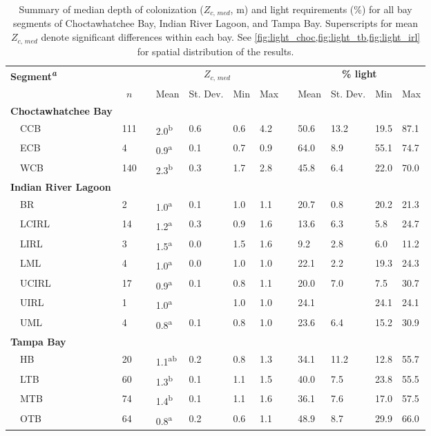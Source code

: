 \documentclass[letterpaper,12pt,oneside]{article}\usepackage[]{graphicx}\usepackage[]{color}
\begin{document}
\begin{table}[!tbp]
{\small
\caption{Summary of median depth of colonization ($Z_{c,\,med}$, m) and light requirements (\%) for all bay segments of Choctawhatchee Bay, Indian River Lagoon, and Tampa Bay.  Superscripts for mean $Z_{c,\,med}$ denote significant differences within each bay. See \cref{fig:light_choc,fig:light_tb,fig:light_irl} for spatial distribution of the results.\label{tab:light_summ}} 
\begin{center}
\begin{tabular}{llcllllcllll}
\hline\hline
\multicolumn{1}{l}{\bfseries Segment\textsuperscript{\textit{a}}}&\multicolumn{1}{c}{\bfseries }&\multicolumn{1}{c}{\bfseries }&\multicolumn{4}{c}{\bfseries {\bf $Z_{c,\,med}$}}&\multicolumn{1}{c}{\bfseries }&\multicolumn{4}{c}{\bfseries \% light}\tabularnewline
\cline{4-7} \cline{9-12}
\multicolumn{1}{l}{}&\multicolumn{1}{c}{$n$}&\multicolumn{1}{c}{}&\multicolumn{1}{c}{Mean}&\multicolumn{1}{c}{St. Dev.}&\multicolumn{1}{c}{Min}&\multicolumn{1}{c}{Max}&\multicolumn{1}{c}{}&\multicolumn{1}{c}{Mean}&\multicolumn{1}{c}{St. Dev.}&\multicolumn{1}{c}{Min}&\multicolumn{1}{c}{Max}\tabularnewline
\hline
{\bfseries Choctawhatchee Bay}&&&&&&&&&&&\tabularnewline
~~CCB&111&&2.0\textsuperscript{b}&0.6&0.6&4.2&&50.6&13.2&19.5&87.1\tabularnewline
~~ECB&4&&0.9\textsuperscript{a}&0.1&0.7&0.9&&64.0& 8.9&55.1&74.7\tabularnewline
~~WCB&140&&2.3\textsuperscript{b}&0.3&1.7&2.8&&45.8& 6.4&22.0&70.0\tabularnewline
\hline
{\bfseries Indian River Lagoon}&&&&&&&&&&&\tabularnewline
~~BR&2&&1.0\textsuperscript{a}&0.1&1.0&1.1&&20.7& 0.8&20.2&21.3\tabularnewline
~~LCIRL&14&&1.2\textsuperscript{a}&0.3&0.9&1.6&&13.6& 6.3& 5.8&24.7\tabularnewline
~~LIRL&3&&1.5\textsuperscript{a}&0.0&1.5&1.6&& 9.2& 2.8& 6.0&11.2\tabularnewline
~~LML&4&&1.0\textsuperscript{a}&0.0&1.0&1.0&&22.1& 2.2&19.3&24.3\tabularnewline
~~UCIRL&17&&0.9\textsuperscript{a}&0.1&0.8&1.1&&20.0& 7.0& 7.5&30.7\tabularnewline
~~UIRL&1&&1.0\textsuperscript{a}& &1.0&1.0&&24.1& &24.1&24.1\tabularnewline
~~UML&4&&0.8\textsuperscript{a}&0.1&0.8&1.0&&23.6& 6.4&15.2&30.9\tabularnewline
\hline
{\bfseries Tampa Bay}&&&&&&&&&&&\tabularnewline
~~HB&20&&1.1\textsuperscript{ab}&0.2&0.8&1.3&&34.1&11.2&12.8&55.7\tabularnewline
~~LTB&60&&1.3\textsuperscript{b}&0.1&1.1&1.5&&40.0& 7.5&23.8&55.5\tabularnewline
~~MTB&74&&1.4\textsuperscript{b}&0.1&1.1&1.6&&36.1& 7.6&17.0&57.5\tabularnewline
~~OTB&64&&0.8\textsuperscript{a}&0.2&0.6&1.1&&48.9& 8.7&29.9&66.0\tabularnewline
\hline
\end{tabular}\end{center}}


\end{table}
\end{document}
